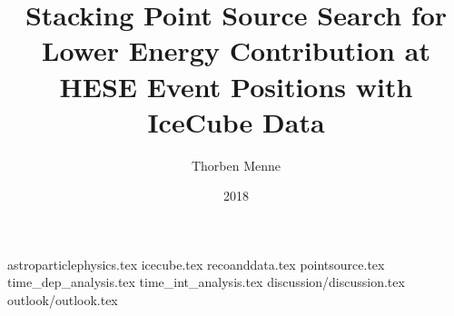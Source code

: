 

\author{Thorben Menne}
\title{Stacking Point Source Search for Lower Energy Contribution at HESE Event Positions with IceCube Data}
\date{2018}




\frontmatter
\maketitle
\tableofcontents

\mainmatter
{astroparticlephysics.tex}
{icecube.tex}
{recoanddata.tex}
{pointsource.tex}
{time_dep_analysis.tex}
{time_int_analysis.tex}
{discussion/discussion.tex}
{outlook/outlook.tex}

\appendix

\backmatter
% 



